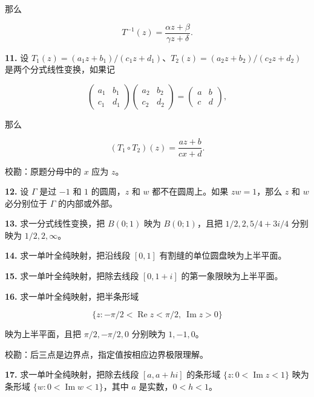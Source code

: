 \documentclass[11pt,a4paper]{article}
\begin{document}
那么

\[
T^{-1}(z)=\frac{\alpha z+\beta}{\gamma z+\delta}.
\]

\par{}
\noindent\textbf{11.} 设
\(T_1(z)=(a_1z+b_1)/(c_1z+d_1)\)、\(T_2(z)=(a_2z+b_2)/(c_2z+d_2)\)
是两个分式线性变换，如果记

\[
\begin{pmatrix}a_1&b_1\\c_1&d_1\end{pmatrix}
\begin{pmatrix}a_2&b_2\\c_2&d_2\end{pmatrix}
=\begin{pmatrix}a&b\\c&d\end{pmatrix},
\]

那么

\[
(T_1\circ T_2)(z)=\frac{az+b}{cx+d}.
\]

校勘：原题分母中的 \(x\) 应为 \(z\)。

\par{}
\noindent\textbf{12.} 设 \(\Gamma\) 是过 \(-1\) 和 \(1\) 的圆周，\(z\) 和 \(w\)
都不在圆周上。如果 \(zw=1\)，那么 \(z\) 和 \(w\) 必分别位于 \(\Gamma\)
的内部或外部。

\par{}
\noindent\textbf{13.} 求一分式线性变换，把 \(B(0;1)\) 映为 \(B(0;1)\)，且把
\(1/2,2,5/4+3i/4\) 分别映为 \(1/2,2,\infty\)。

\par{}
\noindent\textbf{14.} 求一单叶全纯映射，把沿线段 \([0,1]\)
有割缝的单位圆盘映为上半平面。

\par{}
\noindent\textbf{15.} 求一单叶全纯映射，把除去线段 \([0,1+i]\)
的第一象限映为上半平面。

\par{}
\noindent\textbf{16.} 求一单叶全纯映射，把半条形域

\[
\{z:-\pi/2<\operatorname{Re}z<\pi/2,\ \operatorname{Im}z>0\}
\]

映为上半平面，且把 \(\pi/2,-\pi/2,0\) 分别映为 \(1,-1,0\)。

校勘：后三点是边界点，指定值按相应边界极限理解。

\par{}
\noindent\textbf{17.} 求一单叶全纯映射，把除去线段 \([a,a+hi]\) 的条形域
\(\{z:0<\operatorname{Im}z<1\}\) 映为条形域
\(\{w:0<\operatorname{Im}w<1\}\)，其中 \(a\) 是实数，\(0<h<1\)。
\end{document}

